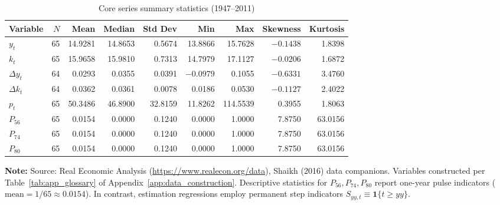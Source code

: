 \begin{longtable}[t]{lrrrrrrrr}
\caption{Core series summary statistics (1947--2011)}\label{tab:app_summary_stats}\\
\toprule
Variable & $N$ & Mean & Median & Std Dev & Min & Max & Skewness & Kurtosis \\
\midrule
$y_t$ & 65 & 14.9281 & 14.8653 & 0.5674 & 13.8866 & 15.7628 & $-0.1438$ & 1.8398 \\
$k_t$ & 65 & 15.9658 & 15.9810 & 0.7313 & 14.7979 & 17.1127 & $-0.0206$ & 1.6872 \\
$\Delta y_t$ & 64 & 0.0293 & 0.0355 & 0.0391 & $-0.0979$ & 0.1055 & $-0.6331$ & 3.4760 \\
$\Delta k_t$ & 64 & 0.0362 & 0.0361 & 0.0078 & 0.0186 & 0.0530 & $-0.1127$ & 2.4022 \\
$p_t$ & 65 & 50.3486 & 46.8900 & 32.8159 & 11.8262 & 114.5539 & 0.3955 & 1.8063 \\
\addlinespace
$P_{56}$ & 65 & 0.0154 & 0.0000 & 0.1240 & 0.0000 & 1.0000 & 7.8750 & 63.0156 \\
$P_{74}$ & 65 & 0.0154 & 0.0000 & 0.1240 & 0.0000 & 1.0000 & 7.8750 & 63.0156 \\
$P_{80}$ & 65 & 0.0154 & 0.0000 & 0.1240 & 0.0000 & 1.0000 & 7.8750 & 63.0156 \\
\bottomrule
\end{longtable}
\noindent\footnotesize\textbf{Note:} Source: Real Economic Analysis (\url{https://www.realecon.org/data}), Shaikh (2016) data companions. Variables constructed per Table~\ref{tab:app_glossary} of Appendix~\ref{app:data_construction}. Descriptive statistics for $P_{56}, P_{74}, P_{80}$ report one-year pulse indicators ($\text{mean} = 1/65 \approx 0.0154$). In contrast, estimation regressions employ permanent step indicators $S_{yy,t} \equiv \mathbf{1}\{t \ge yy\}$.